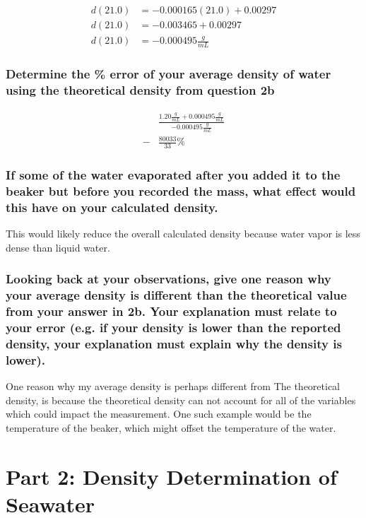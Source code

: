 \documentclass[a4paper,10pt]{article}
\begin{document}
      \begin{align}
        d(21.0) &= -0.000165(21.0) + 0.00297 \\
        d(21.0) &= -0.003465 + 0.00297 \\
        d(21.0) &= -0.000495\frac{g}{mL} 
      \end{align}



  \subsubsection*{Determine the \% error of your average density of water using the theoretical density from question 2b}

  \begin{align}
    &\frac{1.20\frac{g}{mL} + 0.000495\frac{g}{mL}}{-0.000495\frac{g}{mL}} \\
    -&\frac{80033}{33}\% 
  \end{align}


  \subsubsection*{If some of the water evaporated after you added it to the beaker but before you recorded the mass, what effect would this have on your calculated density.}

    This would likely reduce the overall calculated density because water vapor is less dense than liquid water.

  \subsubsection*{Looking back at your observations, give one reason why your average density is different than the theoretical value from your answer in 2b. Your explanation must relate to your error (e.g. if your density is lower than the reported density, your explanation must explain why the density is lower).}

    One reason why my average density is perhaps different from The theoretical density, is because the theoretical density can not account for all of the variables which could impact the measurement. One such example would be the temperature of the beaker, which might offset the temperature of the water.  

  \section{Part 2: Density Determination of Seawater}
\end{document}
